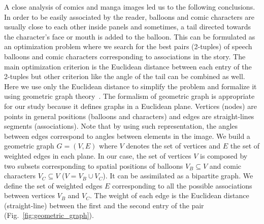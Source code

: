 \documentclass[conference]{IEEEtran}
\begin{document}
A close analysis of comics and manga images led us to the following conclusions.
In order to be easily associated by the reader, balloons and comic characters are usually close to each other inside panels and sometimes, a tail directed towards the character's face or mouth is added to the balloon.
This can be formulated as an optimization problem where we search for the best pairs (2-tuples) of speech balloons and comic characters corresponding to associations in the story.
The main optimization criterion is the Euclidean distance between each entry of the 2-tuples but other criterion like the angle of the tail can be combined as well.
Here we use only the Euclidean distance to simplify the problem and formalize it using geometric graph theory~\cite{pach1999geometric}.
The formalism of geometric graph is appropriate for our study because it defines graphs in a Euclidean plane.
Vertices (nodes) are points in general positions (balloons and characters) and edges are straight-lines segments (associations).
Note that by using such representation, the angles between edges correspond to angles between elements in the image.
We build a geometric graph $G=(V,E)$ where $V$ denotes the set of vertices and $E$ the set of weighted edges in each plane.
In our case, the set of vertices $V$ is composed by two subsets corresponding to spatial positions of balloons $V_B \subseteq V$ and comic characters $V_C \subseteq V$ ($V=V_B \cup V_C$).
It can be assimilated as a bipartite graph.
We define the set of weighted edges $E$ corresponding to all the possible associations between vertices $V_B$ and $V_C$.
The weight of each edge is the Euclidean distance (straight-line) between the first and the second entry of the pair (Fig.~\ref{fig:geometric_graph}).
\end{document}
